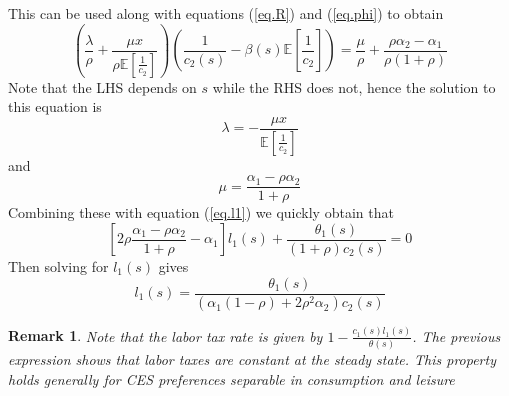 \documentclass[thmsb,11pt]{article}
\newtheorem{remark}{Remark}
\begin{document}
This can be used along with equations (\ref{eq.R}) and (\ref{eq.phi}) to
obtain
\begin{equation*}
\left(\frac\lambda \rho+\frac{\mu x}{\rho\mathbb{E}[\frac1{c_2}]}%
\right)\left(\frac1{c_2(s)}-\beta(s)\mathbb{E}\left[\frac1{c_2}\right]%
\right) = \frac{\mu}{\rho}+\frac{\rho\alpha_2-\alpha_1}{\rho(1+\rho)}
\end{equation*}
Note that the LHS depends on $s$ while the RHS does not, hence the solution to
this equation is
\begin{equation}
\lambda = - \frac{\mu x}{\mathbb{E}[\frac1{c_2}]}
\end{equation}%
and
\begin{equation}
\mu = \frac{\alpha_1-\rho\alpha_2}{1+\rho}  \label{eq.mu}
\end{equation}
Combining these with equation (\ref{eq.l1}) we quickly obtain that
\begin{equation*}
\left[2\rho\frac{\alpha_1-\rho\alpha_2}{1+\rho}-\alpha_1\right]%
l_1(s)+\frac{\theta_1(s)}{\left(1+\rho\right)c_2(s)} = 0
\end{equation*}%
Then solving for $l_1(s)$ gives
\begin{equation*}
l_1(s) = \frac{\theta_1(s)}{\left(\alpha_1(1-\rho)+2\rho^2\alpha_2\right)c_2(s)}
\end{equation*}

\begin{remark}
Note that the labor tax rate is given by $1-\frac{c_1(s)l_1(s)}{\theta(s)}$. The previous expression shows that labor taxes are constant at the steady state. This property holds generally for CES preferences separable in consumption and leisure
\end{remark}
\end{document}
